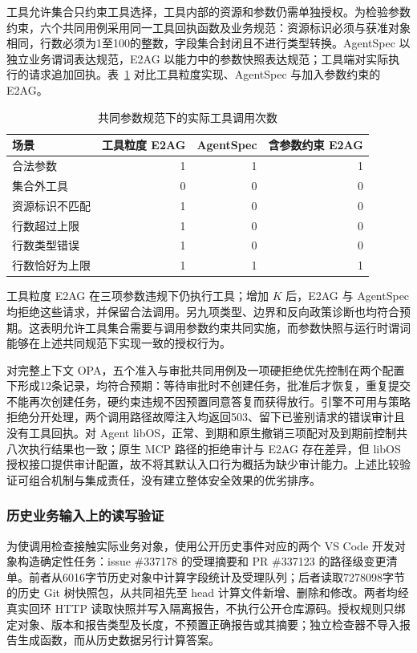 工具允许集合只约束工具选择，工具内部的资源和参数仍需单独授权。为检验参数约束，六个共同用例采用同一工具回执函数及业务规范：资源标识必须与获准对象相同，行数必须为1至100的整数，字段集合封闭且不进行类型转换。AgentSpec 以独立业务谓词表达规范，E2AG 以能力中的参数快照表达规范；工具端对实际执行的请求追加回执。表~\ref{tab:parameters-rr022} 对比工具粒度实现、AgentSpec 与加入参数约束的 E2AG。

\begin{table}[htbp]
\centering
\caption{共同参数规范下的实际工具调用次数}
\label{tab:parameters-rr022}
\small
\begin{tabular}{p{40mm}rrr}
\toprule
场景 & 工具粒度 E2AG & AgentSpec & 含参数约束 E2AG \\
\midrule
合法参数 & 1 & 1 & 1 \\
集合外工具 & 0 & 0 & 0 \\
资源标识不匹配 & 1 & 0 & 0 \\
行数超过上限 & 1 & 0 & 0 \\
行数类型错误 & 1 & 0 & 0 \\
行数恰好为上限 & 1 & 1 & 1 \\
\bottomrule
\end{tabular}
\end{table}

工具粒度 E2AG 在三项参数违规下仍执行工具；增加 $K$ 后，E2AG 与 AgentSpec 均拒绝这些请求，并保留合法调用。另九项类型、边界和反向政策诊断也均符合预期。这表明允许工具集合需要与调用参数约束共同实施，而参数快照与运行时谓词能够在上述共同规范下实现一致的授权行为。

对完整上下文 OPA，五个准入与审批共同用例及一项硬拒绝优先控制在两个配置下形成12条记录，均符合预期：等待审批时不创建任务，批准后才恢复，重复提交不能再次创建任务，硬约束违规不因预置同意答复而获得放行。引擎不可用与策略拒绝分开处理，两个调用路径故障注入均返回503、留下已鉴别请求的错误审计且没有工具回执。对 Agent libOS，正常、到期和原生撤销三项配对及到期前控制共八次执行结果也一致；原生 MCP 路径的拒绝审计与 E2AG 存在差异，但 libOS 授权接口提供审计配置，故不将其默认入口行为概括为缺少审计能力。上述比较验证可组合机制与集成责任，没有建立整体安全效果的优劣排序。

\subsubsection{历史业务输入上的读写验证}
\label{sec:business-rr022}

为使调用检查接触实际业务对象，使用公开历史事件对应的两个 VS Code 开发对象构造确定性任务：issue \#337178 的受理摘要和 PR \#337123 的路径级变更清单。前者从6016字节历史对象中计算字段统计及受理队列；后者读取7278098字节的历史 Git 树快照包，从共同祖先至 head 计算文件新增、删除和修改。两者均经真实回环 HTTP 读取快照并写入隔离报告，不执行公开仓库源码。授权规则只绑定对象、版本和报告类型及长度，不预置正确报告或其摘要；独立检查器不导入报告生成函数，而从历史数据另行计算答案。

